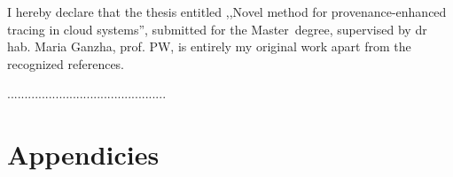 \documentclass[a4paper,11pt,twoside,usenames,dvipsnames]{report}
\makeatletter
\renewcommand{\cftchapaftersnum}{.}%
\renewcommand{\cftsecaftersnum}{.}%
\renewcommand{\cftsubsecaftersnum}{.}%
\def\cleardoublepage{\clearpage\if@twoside
\ifodd\c@page\else\hbox{}\thispagestyle{empty}\newpage
\if@twocolumn\hbox{}\newpage\fi\fi\fi}
\theoremstyle{definition}
\renewcommand{\title}{Novel method for provenance-enhanced tracing in cloud systems}
\newcommand{\type}{Master}
\newcommand{\supervisor}{dr hab. Maria Ganzha, prof. PW} %
\makeatother
\begin{document}
I hereby declare that the thesis entitled ,,\title '', submitted for the \type ~degree, supervised  by \supervisor , is entirely my original work apart from the recognized references.
\vspace{2cm}

\begin{flushright}
  \begin{minipage}{50mm}
    \begin{center}
      ..............................................

    \end{center}
  \end{minipage}
\end{flushright}

\thispagestyle{empty}
\newpage

\null\thispagestyle{empty}\newpage
\setcounter{page}{9}
\tableofcontents
\thispagestyle{empty}
\newpage %



\null\thispagestyle{empty}\newpage
\pagestyle{fancy}

%










\cleardoublepage %
\printbibliography[heading=bibintoc]

\thispagestyle{empty}


\clearpage %
\listoffigures
\thispagestyle{empty}

\renewcommand{\cftchapaftersnum}{}%
\renewcommand{\cftsecaftersnum}{}%
\renewcommand{\cftsubsecaftersnum}{}%

\chapter*{Appendicies}

\thispagestyle{empty}
\end{document}
